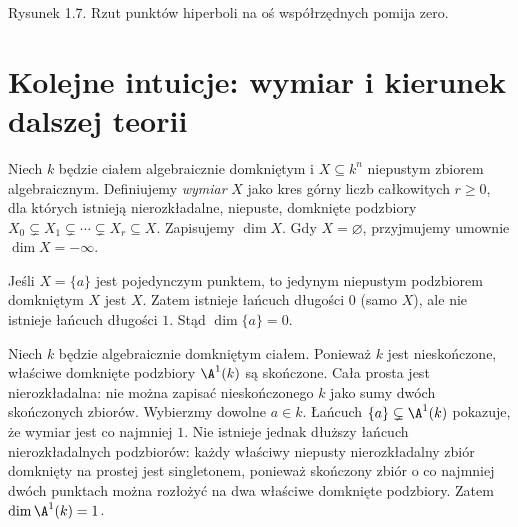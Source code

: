 \begin{center}
\end{center}
\begin{center}\small Rysunek 1.7. Rzut punktów hiperboli na oś współrzędnych pomija zero.\end{center}

\section{Kolejne intuicje: wymiar i kierunek dalszej teorii}

\begin{definicja}
Niech $k$ będzie ciałem algebraicznie domkniętym i
$X\subseteq k^n$ niepustym zbiorem algebraicznym.
Definiujemy \emph{wymiar} $X$ jako kres górny liczb
całkowitych $r\ge0$, dla których istnieją
nierozkładalne, niepuste, domknięte podzbiory
$X_0\subsetneq X_1\subsetneq\cdots\subsetneq X_r\subseteq X$.
Zapisujemy $\dim X$. Gdy $X=\varnothing$, przyjmujemy
umownie $\dim X=-\infty$.
\end{definicja}

\begin{przyklad}
Jeśli $X=\{a\}$ jest pojedynczym punktem, to jedynym
niepustym podzbiorem domkniętym $X$ jest $X$.
Zatem istnieje łańcuch długości $0$ (samo $X$),
ale nie istnieje łańcuch długości $1$.
Stąd $\dim\{a\}=0$.
\end{przyklad}

\begin{przyklad}
Niech $k$ będzie algebraicznie domkniętym ciałem.
Ponieważ $k$ jest nieskończone, właściwe domknięte
podzbiory $\A^1(k)$ są skończone.
Cała prosta jest nierozkładalna: nie można zapisać
nieskończonego $k$ jako sumy dwóch skończonych zbiorów.
Wybierzmy dowolne $a\in k$. Łańcuch
$\{a\}\subsetneq\A^1(k)$ pokazuje, że wymiar jest co najmniej $1$.
Nie istnieje jednak dłuższy łańcuch nierozkładalnych
podzbiorów: każdy właściwy niepusty nierozkładalny zbiór
domknięty na prostej jest singletonem, ponieważ skończony
zbiór o co najmniej dwóch punktach można rozłożyć na dwa
właściwe domknięte podzbiory.
Zatem $\dim\A^1(k)=1$.
\end{przyklad}

